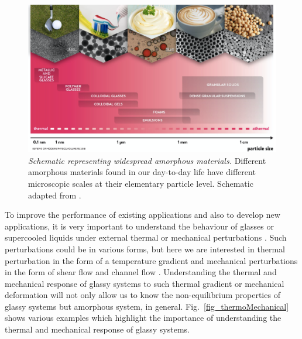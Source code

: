     \begin{figure}[hbt!]
	\includegraphics[width=14cm]{figs/glassyMaterial.pdf}
	\centering
	\caption[{\em Schematic representing widespread amorphous materials}]{{\em Schematic representing widespread amorphous materials.} Different amorphous materials found in our day-to-day life have different microscopic scales at their elementary particle level. Schematic adapted from \cite{nicolas2018deformation}.\label{fig_glassyMaterial}}
    \end{figure}

To improve the performance of existing applications and also to develop new applications, it is very important to understand the behaviour of glasses or supercooled liquids under external thermal or mechanical perturbations \cite{keim2019memory,fiocco2014encoding,priezjev2019effect,schuh2007mechanical,hufnagel2015cryogenic}. Such perturbations could be in various forms, but here we are interested in thermal perturbation in the form of a temperature gradient \cite{vaibhav2020response} and mechanical perturbations in the form of shear flow \cite{ludovicRMP2017} and channel flow \cite{vaibhav2021influence,pinaki2014}. Understanding the thermal and mechanical response of glassy systems to such thermal gradient or mechanical deformation will not only allow us to know the non-equilibrium properties of glassy systems but amorphous system, in general. Fig.~\ref{fig_thermoMechanical} shows various examples which highlight the importance of understanding the thermal and mechanical response of glassy systems.

